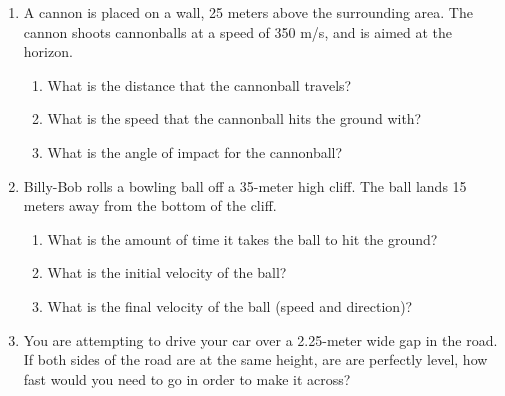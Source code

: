 \documentclass[letterpaper, 12pt]{article}
\begin{document}
\begin{enumerate}
\item A cannon is placed on a wall, 25 meters above the surrounding area.  The cannon shoots cannonballs at a speed of 350 m/s, and is aimed at the horizon.  
\begin{enumerate}
	\item What is the distance that the cannonball travels?
	\vspace{0.5in}
	\item What is the speed that the cannonball hits the ground with?
	\vspace{0.5in}
	\item What is the angle of impact for the cannonball?	
	\vspace{0.5in}
\end{enumerate}


\item Billy-Bob rolls a bowling ball off a 35-meter high cliff.  The ball lands 15 meters away from the bottom of the cliff.
\begin{enumerate}
	\item What is the amount of time it takes the ball to hit the ground?
	\vspace{0.6in}
	\item What is the initial velocity of the ball?
	\vspace{0.6in} 
	\item What is the final velocity of the ball (speed and direction)?
	\vspace{0.6in} 
\end{enumerate}



\item You are attempting to drive your car over a 2.25-meter wide gap in the road.  If both sides of the road are at the same height, are are perfectly level, how fast would you need to go in order to make it across?
	\vspace{0.5in} 
\end{enumerate}
 
\end{document}
